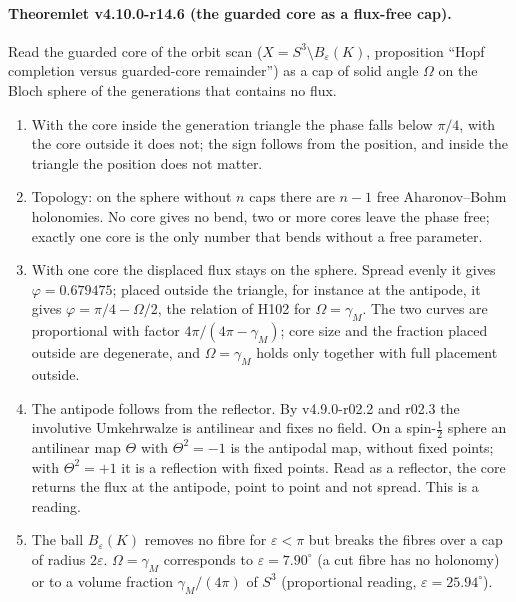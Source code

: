 \paragraph{Theoremlet v4.10.0-r14.6 (the guarded core as a flux-free cap).}
Read the guarded core of the orbit scan (\(X=S^3\setminus B_\varepsilon(K)\), proposition ``Hopf completion versus
guarded-core remainder'') as a cap of solid angle \(\Omega\) on the Bloch sphere of the generations that contains no flux.
\begin{enumerate}[leftmargin=2em]
\item[(a)] With the core inside the generation triangle the phase falls below \(\pi/4\), with the core outside it does not;
the sign follows from the position, and inside the triangle the position does not matter.
\item[(b)] Topology: on the sphere without \(n\) caps there are \(n-1\) free Aharonov--Bohm holonomies.  No core gives no bend,
two or more cores leave the phase free; exactly one core is the only number that bends without a free parameter.
\item[(c)] With one core the displaced flux stays on the sphere.  Spread evenly it gives \(\varphi=0.679475\); placed outside the
triangle, for instance at the antipode, it gives \(\varphi=\pi/4-\Omega/2\), the relation of H102 for \(\Omega=\gamma_M\).  The
two curves are proportional with factor \(4\pi/(4\pi-\gamma_M)\); core size and the fraction placed outside are degenerate,
and \(\Omega=\gamma_M\) holds only together with full placement outside.
\item[(d)] The antipode follows from the reflector.  By v4.9.0-r02.2 and r02.3 the involutive Umkehrwalze is antilinear and
fixes no field.  On a spin-\(\tfrac12\) sphere an antilinear map \(\Theta\) with \(\Theta^2=-1\) is the antipodal map, without fixed
points; with \(\Theta^2=+1\) it is a reflection with fixed points.  Read as a reflector, the core returns the flux at the
antipode, point to point and not spread.  This is a reading.
\item[(e)] The ball \(B_\varepsilon(K)\) removes no fibre for \(\varepsilon<\pi\) but breaks the fibres over a cap of radius
\(2\varepsilon\).  \(\Omega=\gamma_M\) corresponds to \(\varepsilon=7.90^\circ\) (a cut fibre has no holonomy) or to a volume fraction
\(\gamma_M/(4\pi)\) of \(S^3\) (proportional reading, \(\varepsilon=25.94^\circ\)).
\end{enumerate}


